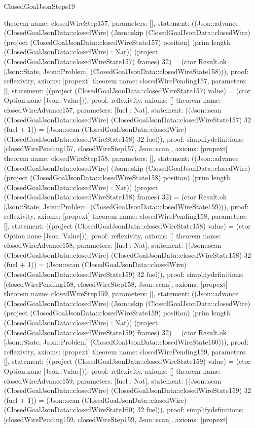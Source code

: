 \begin{lexlean}{ClosedGoalJsonSteps19}
\begin{semanticmodule}
{}
theorem{
 name: closedWireStep157, parameters: [],
 statement: ((Json::advance (ClosedGoalJsonData::closedWire) (Json::skip (ClosedGoalJsonData::closedWire) (project (ClosedGoalJsonData::closedWireState157) position) (prim length (ClosedGoalJsonData::closedWire) : Nat)) (project (ClosedGoalJsonData::closedWireState157) frames) 32) = (ctor Result.ok [Json::State, Json::Problem] (ClosedGoalJsonData::closedWireState158))), proof: reflexivity{}, axioms: [propext]
}
theorem{
 name: closedWirePending157, parameters: [],
 statement: ((project (ClosedGoalJsonData::closedWireState157) value) = (ctor Option.none [Json::Value])), proof: reflexivity{}, axioms: []
}
theorem{
 name: closedWireAdvance157, parameters: [fuel : Nat],
 statement: ((Json::scan (ClosedGoalJsonData::closedWire) (ClosedGoalJsonData::closedWireState157) 32 (fuel + 1)) = (Json::scan (ClosedGoalJsonData::closedWire) (ClosedGoalJsonData::closedWireState158) 32 fuel)), proof: simplify{definitions: [closedWirePending157, closedWireStep157, Json::scan]}, axioms: [propext]
}
theorem{
 name: closedWireStep158, parameters: [],
 statement: ((Json::advance (ClosedGoalJsonData::closedWire) (Json::skip (ClosedGoalJsonData::closedWire) (project (ClosedGoalJsonData::closedWireState158) position) (prim length (ClosedGoalJsonData::closedWire) : Nat)) (project (ClosedGoalJsonData::closedWireState158) frames) 32) = (ctor Result.ok [Json::State, Json::Problem] (ClosedGoalJsonData::closedWireState159))), proof: reflexivity{}, axioms: [propext]
}
theorem{
 name: closedWirePending158, parameters: [],
 statement: ((project (ClosedGoalJsonData::closedWireState158) value) = (ctor Option.none [Json::Value])), proof: reflexivity{}, axioms: []
}
theorem{
 name: closedWireAdvance158, parameters: [fuel : Nat],
 statement: ((Json::scan (ClosedGoalJsonData::closedWire) (ClosedGoalJsonData::closedWireState158) 32 (fuel + 1)) = (Json::scan (ClosedGoalJsonData::closedWire) (ClosedGoalJsonData::closedWireState159) 32 fuel)), proof: simplify{definitions: [closedWirePending158, closedWireStep158, Json::scan]}, axioms: [propext]
}
theorem{
 name: closedWireStep159, parameters: [],
 statement: ((Json::advance (ClosedGoalJsonData::closedWire) (Json::skip (ClosedGoalJsonData::closedWire) (project (ClosedGoalJsonData::closedWireState159) position) (prim length (ClosedGoalJsonData::closedWire) : Nat)) (project (ClosedGoalJsonData::closedWireState159) frames) 32) = (ctor Result.ok [Json::State, Json::Problem] (ClosedGoalJsonData::closedWireState160))), proof: reflexivity{}, axioms: [propext]
}
theorem{
 name: closedWirePending159, parameters: [],
 statement: ((project (ClosedGoalJsonData::closedWireState159) value) = (ctor Option.none [Json::Value])), proof: reflexivity{}, axioms: []
}
theorem{
 name: closedWireAdvance159, parameters: [fuel : Nat],
 statement: ((Json::scan (ClosedGoalJsonData::closedWire) (ClosedGoalJsonData::closedWireState159) 32 (fuel + 1)) = (Json::scan (ClosedGoalJsonData::closedWire) (ClosedGoalJsonData::closedWireState160) 32 fuel)), proof: simplify{definitions: [closedWirePending159, closedWireStep159, Json::scan]}, axioms: [propext]
}
\end{semanticmodule}
\end{lexlean}
